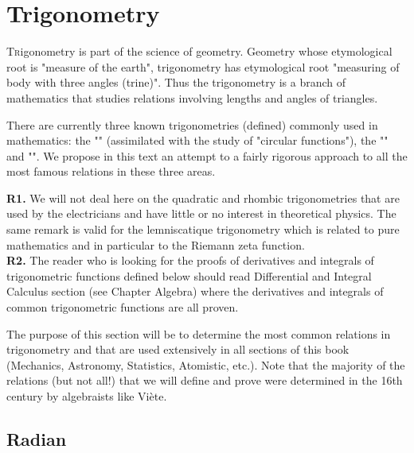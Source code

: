 	\newpage
	\thispagestyle{empty}
	\mbox{}
	\section{Trigonometry}
	\lettrine[lines=4]{\color{BrickRed}T}rigonometry is part of the science of geometry. Geometry whose etymological root is "measure of the earth", trigonometry has etymological root "measuring of body with three angles (trine)". Thus the trigonometry is a branch of mathematics that studies relations involving lengths and angles of triangles.

There are currently three known trigonometries (defined) commonly used in mathematics: the "" (assimilated with the study of "circular functions"), the  "" and  "". We propose in this text an attempt to a fairly rigorous approach to all the most famous relations in these three areas.

	\begin{tcolorbox}[title=Remarks,colframe=black,arc=10pt]
\textbf{R1.} We will not deal here on the quadratic and rhombic trigonometries that are used by the electricians and have little or no interest in theoretical physics. The same remark is valid for the lemniscatique trigonometry which is related to pure mathematics and in particular to the Riemann zeta function.\\

\textbf{R2.} The reader who is looking for the proofs of derivatives and integrals of trigonometric functions defined below should read Differential and Integral Calculus section (see Chapter Algebra) where the derivatives and integrals of common trigonometric functions are all proven.
	\end{tcolorbox}	

	The purpose of this section will be to determine the most common relations in trigonometry and that are used extensively in all sections of this book (Mechanics, Astronomy, Statistics, Atomistic, etc.). Note that the majority of the relations (but not all!) that we will define and prove were determined in the 16th century by algebraists like Viète.

	\subsection{Radian}

